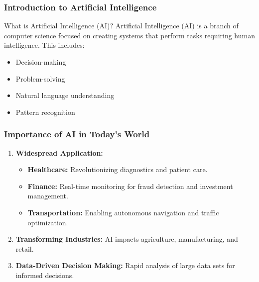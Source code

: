 \documentclass[aspectratio=169]{beamer}
\begin{document}
\frame{\titlepage}

\begin{frame}[fragile]
    \frametitle{Introduction to Artificial Intelligence}
    \begin{block}{What is Artificial Intelligence (AI)?}
        Artificial Intelligence (AI) is a branch of computer science focused on creating systems that perform tasks requiring human intelligence. This includes:
    \end{block}
    \begin{itemize}
        \item Decision-making
        \item Problem-solving
        \item Natural language understanding
        \item Pattern recognition
    \end{itemize}
\end{frame}

\begin{frame}[fragile]
    \frametitle{Importance of AI in Today's World}
    \begin{enumerate}
        \item \textbf{Widespread Application:}
        \begin{itemize}
            \item \textbf{Healthcare:} Revolutionizing diagnostics and patient care.
            \item \textbf{Finance:} Real-time monitoring for fraud detection and investment management.
            \item \textbf{Transportation:} Enabling autonomous navigation and traffic optimization.
        \end{itemize}
        \item \textbf{Transforming Industries:} AI impacts agriculture, manufacturing, and retail.
        \item \textbf{Data-Driven Decision Making:} Rapid analysis of large data sets for informed decisions.
    \end{enumerate}
\end{frame}
\end{document}
